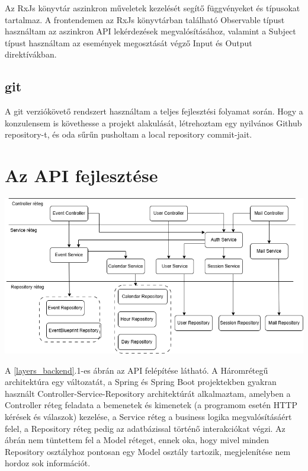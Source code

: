 \documentclass[a4paper,12pt]{report}
\theoremstyle{definition}
\theoremstyle{remark}
\begin{document}
Az RxJs\cite{Rxjswebsite} könyvtár aszinkron műveletek kezelését segítő függvényeket és típusokat tartalmaz. A frontendemen az RxJs könyvtárban található Observable típust használtam az aszinkron API lekérdezések megvalósításához, valamint a Subject típust használtam az események megosztását végző Input és Output direktívákban.

\section{git}

A git\cite{Gitwebsite} verziókövető rendszert használtam a teljes fejlesztési folyamat során. Hogy a konzulensem is követhesse a projekt alakulását, létrehoztam egy nyilvános Github\cite{GitHubwebsite} repository-t, és oda sűrűn pusholtam a local repository commit-jait.


\chapter{Az API fejlesztése}

\begin{center}
\includegraphics[width=150mm]{layers_backend}
\captionsetup{width=0.8\linewidth}
\label{layers_backend}
\end{center}

A \ref{layers_backend}.1-es ábrán az API felépítése látható. A Háromrétegű architektúra\cite{3layerwebsite} egy változatát, a Spring és Spring Boot projektekben gyakran használt Controller-Service-Repository architektúrát alkalmaztam, amelyben a Controller réteg feladata a bemenetek és kimenetek (a programom esetén HTTP kérések és válaszok) kezelése, a Service réteg a business logika megvalósításáért felel, a Repository réteg pedig az adatbázissal történő interakciókat végzi. Az ábrán nem tüntettem fel a Model réteget, ennek oka, hogy mivel minden Repository osztályhoz pontosan egy Model osztály tartozik, megjelenítése nem hordoz sok információt.
\end{document}
